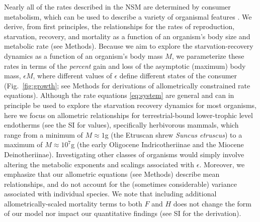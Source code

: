 \documentclass[twocolumn,preprintnumbers,amsmath,amssymb,superscriptaddress]{revtex4}
\begin{document}
\begin{bibunit}[unsrt]
  Nearly all of the rates described in the NSM are determined by consumer
  metabolism, which can be used to describe a variety of organismal features
  \citep{Brown:2004wq}.  We derive, from first principles, the relationships
  for the rates of reproduction, starvation, recovery, and mortality as a
  function of an organism's body size and metabolic rate (see Methods).
  Because we aim to explore the starvation-recovery dynamics as a function of
  an organism's body mass $M$, we parameterize these rates in terms of the
  \emph{percent} gain and loss of the asymptotic (maximum) body mass,
  $\epsilon M$, where different values of $\epsilon$ define different states of
  the consumer (Fig.~\ref{fig:growth}; see Methods for derivations of
  allometrically constrained rate equations).  Although the rate equations
  \eqref{eq:system} are general and can in principle be used to explore the
  starvation recovery dynamics for most organisms, here we focus on allometric
  relationships for terrestrial-bound lower-trophic level endotherms (see the
  SI for values), specifically herbivorous mammals, which range from a minimum
  of $M\approx1$g (the Etruscan shrew \emph{Suncus etruscus}) to a maximum of
  $M\approx10^7$g (the early Oligocene Indricotheriinae and the Miocene
  Deinotheriinae).  Investigating other classes of organisms would simply
  involve altering the metabolic exponents and scalings associated with
  $\epsilon$. Moreover, we emphasize that our allometric equations (see
  Methods) describe mean relationships, and do not account for the (sometimes
  considerable) variance associated with individual species.  We note that
  including additional allometrically-scaled mortality terms to both $F$ and
  $H$ does not change the form of our model nor impact our quantitative findings
  (see SI for the derivation).


\end{bibunit}
\end{document}

